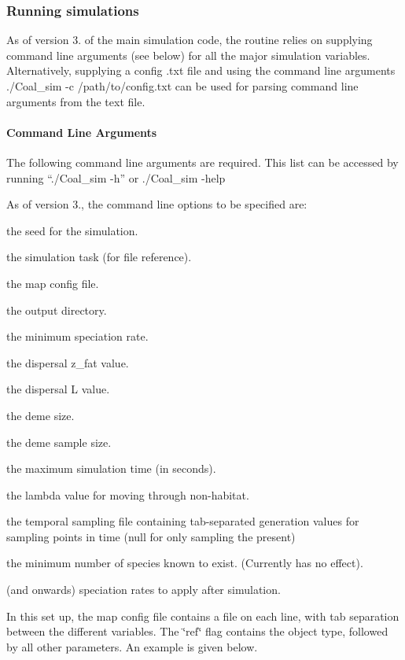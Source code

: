 \subsubsection*{Running simulations}

As of version 3. of the main simulation code, the routine relies on supplying command line arguments (see below) for all the major simulation variables. Alternatively, supplying a config .txt file and using the command line arguments {\ttfamily ./\+Coal\+\_\+sim -\/c /path/to/config.txt} can be used for parsing command line arguments from the text file.

\paragraph*{Command Line Arguments}

The following command line arguments are required. This list can be accessed by running {\ttfamily “./\+Coal\+\_\+sim -\/h”} or {\ttfamily ./\+Coal\+\_\+sim -\/help}

As of version 3., the command line options to be specified are\+:


\begin{DoxyEnumerate}
\item the seed for the simulation.
\item the simulation task (for file reference).
\item the map config file.
\item the output directory.
\item the minimum speciation rate.
\item the dispersal z\+\_\+fat value.
\item the dispersal L value.
\item the deme size.
\item the deme sample size.
\item the maximum simulation time (in seconds).
\item the lambda value for moving through non-\/habitat.
\item the temporal sampling file containing tab-\/separated generation values for sampling points in time (null for only sampling the present)
\item the minimum number of species known to exist. (Currently has no effect).
\item (and onwards) speciation rates to apply after simulation.
\end{DoxyEnumerate}

In this set up, the map config file contains a file on each line, with tab separation between the different variables. The \char`\"{}ref\char`\"{} flag contains the object type, followed by all other parameters. An example is given below.

